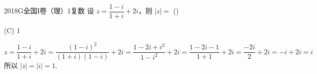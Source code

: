
\begin{problem}{2018}{G}{全国I卷（理）}{1}{复数}
设 $ z = \dfrac{1 - i}{1 + i} + 2i $，则 $ |z| = $ (\hspace{1cm})
\begin{choices}
\end{choices}
\end{problem}

\begin{answer}
(C) $1$
\end{answer}

\begin{solutions}
$$
z = \dfrac{1 - i}{1 + i} + 2i = \dfrac{(1 - i)^2}{(1 + i)(1 - i)} + 2i = \dfrac{1 - 2i + i^2}{1 - i^2} + 2i = \dfrac{1 - 2i - 1}{1 + 1} + 2i = \dfrac{-2i}{2} + 2i = -i + 2i = i
$$
所以 $ |z| = |i| = 1 $.
\end{solutions}